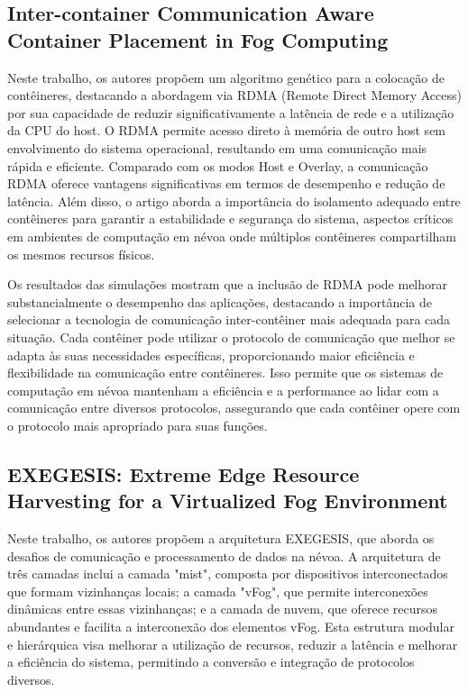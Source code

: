 \subsection{Inter-container Communication Aware Container Placement in Fog Computing}

Neste trabalho, os autores propõem um algoritmo genético para a colocação de contêineres, destacando a abordagem via RDMA (Remote Direct Memory Access) por sua capacidade de reduzir significativamente a latência de rede e a utilização da CPU do host. O RDMA permite acesso direto à memória de outro host sem envolvimento do sistema operacional, resultando em uma comunicação mais rápida e eficiente. Comparado com os modos Host e Overlay, a comunicação RDMA oferece vantagens significativas em termos de desempenho e redução de latência. Além disso, o artigo aborda a importância do isolamento adequado entre contêineres para garantir a estabilidade e segurança do sistema, aspectos críticos em ambientes de computação em névoa onde múltiplos contêineres compartilham os mesmos recursos físicos.

Os resultados das simulações mostram que a inclusão de RDMA pode melhorar substancialmente o desempenho das aplicações, destacando a importância de selecionar a tecnologia de comunicação inter-contêiner mais adequada para cada situação. Cada contêiner pode utilizar o protocolo de comunicação que melhor se adapta às suas necessidades específicas, proporcionando maior eficiência e flexibilidade na comunicação entre contêineres. Isso permite que os sistemas de computação em névoa mantenham a eficiência e a performance ao lidar com a comunicação entre diversos protocolos, assegurando que cada contêiner opere com o protocolo mais apropriado para suas funções.

\subsection{EXEGESIS: Extreme Edge Resource Harvesting for a Virtualized Fog Environment}

Neste trabalho, os autores propõem a arquitetura EXEGESIS, que aborda os desafios de comunicação e processamento de dados na névoa. A arquitetura de três camadas inclui a camada "mist", composta por dispositivos interconectados que formam vizinhanças locais; a camada "vFog", que permite interconexões dinâmicas entre essas vizinhanças; e a camada de nuvem, que oferece recursos abundantes e facilita a interconexão dos elementos vFog. Esta estrutura modular e hierárquica visa melhorar a utilização de recursos, reduzir a latência e melhorar a eficiência do sistema, permitindo a conversão e integração de protocolos diversos.

